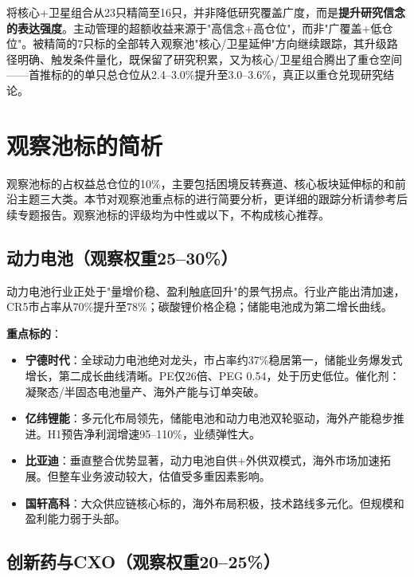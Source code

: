 \begin{keyinsight}[精简组合的核心理念]
将核心+卫星组合从23只精简至16只，并非降低研究覆盖广度，而是\textbf{提升研究信念的表达强度}。主动管理的超额收益来源于"高信念+高仓位"，而非"广覆盖+低仓位"。被精简的7只标的全部转入观察池"核心/卫星延伸"方向继续跟踪，其升级路径明确、触发条件量化，既保留了研究积累，又为核心/卫星组合腾出了重仓空间——首推标的的单只总仓位从2.4--3.0\%提升至3.0--3.6\%，真正以重仓兑现研究结论。
\end{keyinsight}

\section{观察池标的简析}

观察池标的占权益总仓位的10\%，主要包括困境反转赛道、核心板块延伸标的和前沿主题三大类。本节对观察池重点标的进行简要分析，更详细的跟踪分析请参考后续专题报告。观察池标的评级均为中性或以下，不构成核心推荐。

\subsection{动力电池（观察权重25--30\%）}

动力电池行业正处于"量增价稳、盈利触底回升"的景气拐点。行业产能出清加速，CR5市占率从70\%提升至78\%；碳酸锂价格企稳；储能电池成为第二增长曲线。

\textbf{重点标的}：
\vspace{0.2em}
\begin{itemize}[leftmargin=2em]
\item \textbf{宁德时代}：全球动力电池绝对龙头，市占率约37\%稳居第一，储能业务爆发式增长，第二成长曲线清晰。PE仅26倍、PEG 0.54，处于历史低位。催化剂：凝聚态/半固态电池量产、海外产能与订单突破。
\item \textbf{亿纬锂能}：多元化布局领先，储能电池和动力电池双轮驱动，海外产能稳步推进。H1预告净利润增速95--110\%，业绩弹性大。
\item \textbf{比亚迪}：垂直整合优势显著，动力电池自供+外供双模式，海外市场加速拓展。但整车业务波动较大，估值受多重因素影响。
\item \textbf{国轩高科}：大众供应链核心标的，海外布局积极，技术路线多元化。但规模和盈利能力弱于头部。
\end{itemize}

\subsection{创新药与CXO（观察权重20--25\%）}

